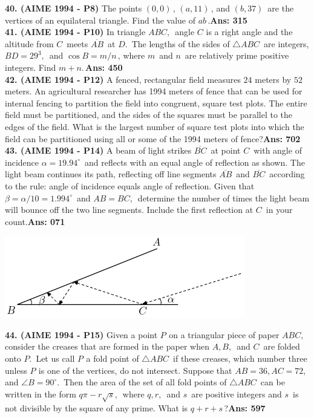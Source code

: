 \documentclass[letterpaper,10pt,addpoints]{exam}
\begin{document}
\textbf{40. (AIME 1994 - P8) }The points $(0,0)\,$, $(a,11)\,$, and $(b,37)\,$ are the vertices of an equilateral triangle. Find the value of $ab\,$.\quad\textbf{Ans: 315}\\

\textbf{41. (AIME 1994 - P10) }In triangle $ABC,\,$ angle $C$ is a right angle and the altitude from $C\,$ meets $\overline{AB}\,$ at $D.\,$ The lengths of the sides of $\triangle ABC\,$ are integers, $BD=29^3,\,$ and $\cos B=m/n\,$, where $m\,$ and $n\,$ are relatively prime positive integers. Find $m+n.\,$\quad\textbf{Ans: 450}\\

\textbf{42. (AIME 1994 - P12) }A fenced, rectangular field measures $24$ meters by $52$ meters. An agricultural researcher has 1994 meters of fence that can be used for internal fencing to partition the field into congruent, square test plots. The entire field must be partitioned, and the sides of the squares must be parallel to the edges of the field. What is the largest number of square test plots into which the field can be partitioned using all or some of the 1994 meters of fence?\quad\textbf{Ans: 702}\\

\textbf{43. (AIME 1994 - P14) }A beam of light strikes $\overline{BC}\,$ at point $C\,$ with angle of incidence $\alpha=19.94^\circ\,$ and reflects with an equal angle of reflection as shown. The light beam continues its path, reflecting off line segments $\overline{AB}\,$ and $\overline{BC}\,$ according to the rule: angle of incidence equals angle of reflection. Given that $\beta=\alpha/10=1.994^\circ\,$ and $AB=BC,\,$ determine the number of times the light beam will bounce off the two line segments. Include the first reflection at $C\,$ in your count.\quad\textbf{Ans: 071}

\begin{center}
\includegraphics[scale=0.6]{AIME_1994_Problem_14.png}
\end{center}

\textbf{44. (AIME 1994 - P15) }Given a point $P^{}_{}$ on a triangular piece of paper $ABC,\,$ consider the creases that are formed in the paper when $A, B,\,$ and $C\,$ are folded onto $P.\,$ Let us call $P_{}^{}$ a fold point of $\triangle ABC\,$ if these creases, which number three unless $P^{}_{}$ is one of the vertices, do not intersect. Suppose that $AB=36, AC=72,\,$ and $\angle B=90^\circ.\,$ Then the area of the set of all fold points of $\triangle ABC\,$ can be written in the form $q\pi-r\sqrt{s},\,$ where $q, r,\,$ and $s\,$ are positive integers and $s\,$ is not divisible by the square of any prime. What is $q+r+s\,$?\quad\textbf{Ans: 597}\\
\end{document}
